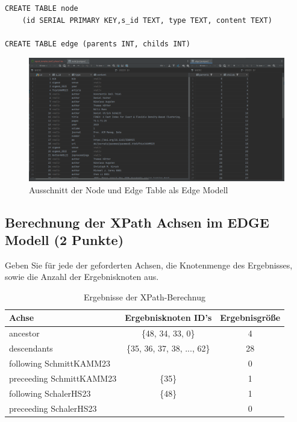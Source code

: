 \documentclass[11pt]{scrartcl}
\begin{document}
\begin{lstlisting}[style=dmrsql]
CREATE TABLE node
    (id SERIAL PRIMARY KEY,s_id TEXT, type TEXT, content TEXT)

CREATE TABLE edge (parents INT, childs INT)
\end{lstlisting}

\begin{figure}[H]
    \includegraphics[width=\linewidth]{ausschnitt_node_table.png}
    \caption{Ausschnitt der Node und Edge Table als Edge Modell}\label{fig:node}
\end{figure}

\subsection*{Berechnung der XPath Achsen im EDGE Modell (2 Punkte)}

Geben Sie für jede der geforderten Achsen, die Knotenmenge des Ergebnisses, sowie die Anzahl der Ergebnisknoten aus.

\begin{table}[h]
	\centering
		\begin{center}
			\begin{tabular}{ l | c c }
				\toprule
				Achse & Ergebnisknoten ID's & Ergebnisgröße\\
				\midrule
				ancestor & \{48, 34, 33, 0\} & 4 \\
				descendants & \{35, 36, 37, 38, ..., 62\} & 28 \\
				following SchmittKAMM23 & \emptyset   & 0 \\
				preceeding SchmittKAMM23 & \{35\} & 1 \\
				following SchalerHS23 & \{48\} & 1 \\
				preceeding SchalerHS23 & \emptyset & 0 \\
				\bottomrule
			\end{tabular}
			\end{center}
	\caption{Ergebnisse der XPath-Berechnug}
	\label{tab:ErgebnisseDerXPathBerechnug}
\end{table}
\end{document}
